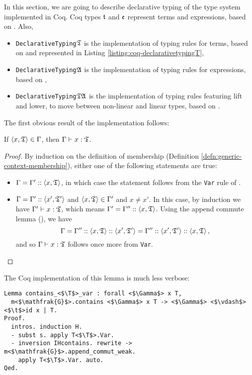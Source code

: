 In this section, we are going to describe declarative typing of the type system implemented in Coq.
%
Coq types $\mathfrak{t}$ and $\mathfrak{e}$ represent terms and expressions, based on .
Also,
\begin{itemize}
    \item \texttt{DeclarativeTyping}$\mathfrak{T}$ is the implementation of typing rules for terms, based on  and represented in Listing \ref{listing:coq-declarativetypingT},
    \item \texttt{DeclarativeTyping}$\mathfrak{A}$ is the implementation of typing rules for expressions, based on ,
    \item \texttt{DeclarativeTyping}$\mathfrak{T}\mathfrak{A}$ is the implementation of typing rules featuring lift and lower, to move between non-linear and linear types, based on .
\end{itemize}

The first obvious result of the implementation follows:

\begin{lemma}
If $\left\langle x, \mathfrak{T} \right\rangle \in \Gamma$, then $\Gamma \vdash x : \mathfrak{T}$.
\end{lemma}
\begin{proof}
By induction on the definition of membership (Definition \ref{defn:generic-context-membership}), either one of the following statements are true:
\begin{itemize}
    \item $\Gamma = \Gamma' :: \left\langle x, \mathfrak{T} \right\rangle$, in which case the statement follows from the \texttt{Var} rule of .
    \item $\Gamma = \Gamma' :: \left\langle x', \mathfrak{T}' \right\rangle$ and $\left\langle x, \mathfrak{T} \right\rangle \in \Gamma'$ and $x \not= x'$. In this case, by induction we have $\Gamma' \vdash x : \mathfrak{T}$, which means $\Gamma' = \Gamma'' :: \left\langle x, \mathfrak{T} \right\rangle$. Using the append commute lemma (), we have
    \[
    \Gamma = \Gamma'' :: \left\langle x, \mathfrak{T} \right\rangle :: \left\langle x', \mathfrak{T}' \right\rangle = \Gamma'' :: \left\langle x', \mathfrak{T}' \right\rangle :: \left\langle x, \mathfrak{T} \right\rangle,
    \]
    and so $\Gamma \vdash x : \mathfrak{T}$ follows once more from \texttt{Var}. \qedhere
\end{itemize}
\end{proof}

The Coq implementation of this lemma is much less verbose:

\begin{verbatim}
Lemma contains_<$\T$>_var : forall <$\Gamma$> x T,
  m<$\mathfrak{G}$>.contains <$\Gamma$> x T -> <$\Gamma$> <$\vdash$> <$\t$>id x | T.
Proof.
  intros. induction H.
  - subst s. apply T<$\T$>.Var.
  - inversion IHcontains. rewrite -> m<$\mathfrak{G}$>.append_commut_weak.
    apply T<$\T$>.Var. auto.
Qed.
\end{verbatim}
